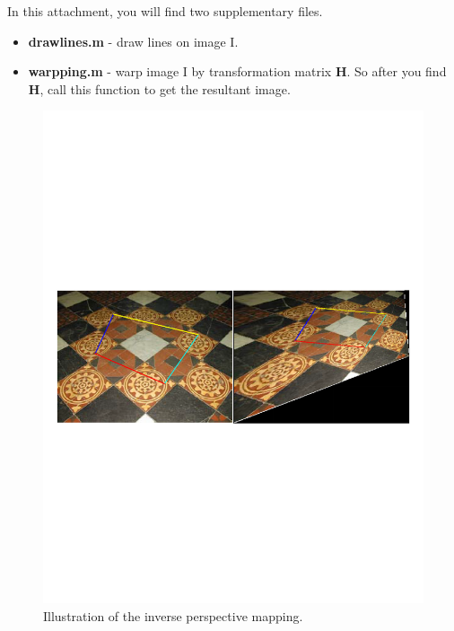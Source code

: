 \documentclass[a4paper]{article}
\begin{document}
In this attachment, you will find two supplementary files.
\begin{itemize}
\item \textbf{drawlines.m} - draw lines on image I.
\item \textbf{warpping.m} - warp image I by transformation matrix $\mathbf{H}$. So after you find $\mathbf{H}$, call this function to get the resultant image.
\end{itemize}
\begin{figure}[!b]
\centering
\includegraphics[scale=0.6]{figures/ipm}
\caption{Illustration of the inverse perspective mapping.}
\end{figure}


 
 

\end{document}
